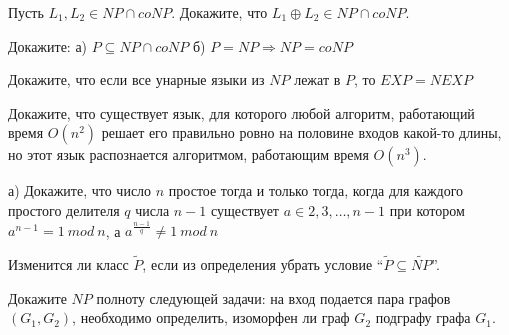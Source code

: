 \setcounter{curtask}{33}


\begin{task}
    Пусть $L_1, L_2 \in NP \cap coNP$. Докажите, что $L_1 \oplus L_2 \in NP \cap coNP$.
\end{task}

\begin{task}
	Докажите:
    а) $P \subseteq NP \cap coNP$
    б) $P = NP \Rightarrow NP = coNP$
\end{task}

\begin{task}
	Докажите, что если все унарные языки из $NP$ лежат в $P$, то $EXP = NEXP$
\end{task}

\begin{task}
    Докажите, что существует язык, для которого любой алгоритм, работающий время
    $O(n^2)$ решает его правильно ровно на половине входов какой-то длины, но
    этот язык распознается алгоритмом, работающим время $O(n^3)$.
\end{task}

\breakline

\begin{ptask}{29}
    а) Докажите, что число $n$ простое тогда и только тогда, когда для каждого
    простого делителя $q$ числа $n - 1$ существует $a \in {2, 3, \dots, n - 1}$ при котором
    $a^{n - 1} = 1~mod~n$, а $a^{\frac{n - 1}{q}} \ne 1~mod~n$
\end{ptask}

\begin{ptask}{30}
    Изменится ли класс $\widetilde{P}$, если из определения убрать условие
    ``$\widetilde{P} \subseteq \widetilde{NP}$''.
\end{ptask}

\begin{ptask}{31}
    Докажите $NP$ полноту следующей задачи:
    на вход подается пара графов $(G_1, G_2)$, необходимо определить, изоморфен ли
    граф $G_2$ подграфу графа $G_1$.
\end{ptask}